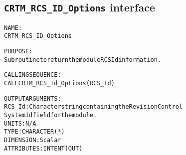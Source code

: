 \subsection{\texttt{CRTM\_RCS\_ID\_Options} interface}
  \label{sec:CRTM_RCS_ID_Options_interface}
  \begin{alltt}
 
  NAME:
        CRTM_RCS_ID_Options
 
  PURPOSE:
        Subroutine to return the module RCS Id information.
 
  CALLING SEQUENCE:
        CALL CRTM_RCS_Id_Options( RCS_Id )
 
  OUTPUT ARGUMENTS:
        RCS_Id:        Character string containing the Revision Control
                       System Id field for the module.
                       UNITS:      N/A
                       TYPE:       CHARACTER(*)
                       DIMENSION:  Scalar
                       ATTRIBUTES: INTENT(OUT)
 
  \end{alltt}
